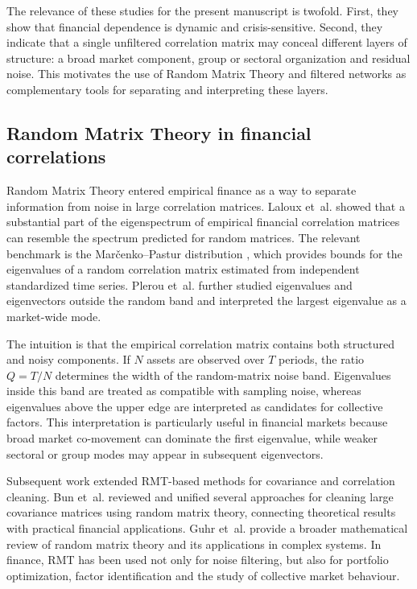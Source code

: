 The relevance of these studies for the present manuscript is twofold. First, they show that financial dependence is dynamic and crisis-sensitive. Second, they indicate that a single unfiltered correlation matrix may conceal different layers of structure: a broad market component, group or sectoral organization and residual noise. This motivates the use of Random Matrix Theory and filtered networks as complementary tools for separating and interpreting these layers.

\subsection{Random Matrix Theory in financial correlations}

Random Matrix Theory entered empirical finance as a way to separate information from noise in large correlation matrices. Laloux et~al. \cite{laloux_1999_noise,laloux_2000_random} showed that a substantial part of the eigenspectrum of empirical financial correlation matrices can resemble the spectrum predicted for random matrices. The relevant benchmark is the Mar\v{c}enko--Pastur distribution \cite{marcenko_1967_distribution}, which provides bounds for the eigenvalues of a random correlation matrix estimated from independent standardized time series. Plerou et~al. \cite{plerou_2002_random} further studied eigenvalues and eigenvectors outside the random band and interpreted the largest eigenvalue as a market-wide mode.

The intuition is that the empirical correlation matrix contains both structured and noisy components. If $N$ assets are observed over $T$ periods, the ratio $Q=T/N$ determines the width of the random-matrix noise band. Eigenvalues inside this band are treated as compatible with sampling noise, whereas eigenvalues above the upper edge are interpreted as candidates for collective factors. This interpretation is particularly useful in financial markets because broad market co-movement can dominate the first eigenvalue, while weaker sectoral or group modes may appear in subsequent eigenvectors.

Subsequent work extended RMT-based methods for covariance and correlation cleaning. Bun et~al. \cite{bun_2017_cleaning} reviewed and unified several approaches for cleaning large covariance matrices using random matrix theory, connecting theoretical results with practical financial applications. Guhr et~al. \cite{guhr_muller_1998} provide a broader mathematical review of random matrix theory and its applications in complex systems. In finance, RMT has been used not only for noise filtering, but also for portfolio optimization, factor identification and the study of collective market behaviour.


